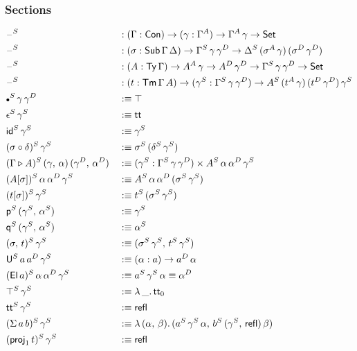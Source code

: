 \documentclass[12pt,a4paper,twoside,openany]{book}
\theoremstyle{remark}
\theoremstyle{definition}
\theoremstyle{theorem}
\newcommand{\refl}{\mathsf{refl}}
\newcommand{\id}{\mathsf{id}}
\newcommand{\Con}{\mathsf{Con}}
\newcommand{\Sub}{\mathsf{Sub}}
\newcommand{\Tm}{\mathsf{Tm}}
\newcommand{\Ty}{\mathsf{Ty}}
\newcommand{\U}{\mathsf{U}}
\newcommand{\El}{\mathsf{El}}
\newcommand{\proj}{\mathsf{proj}}
\renewcommand{\tt}{\mathsf{tt}}
\newcommand{\blank}{\mathord{\hspace{1pt}\text{--}\hspace{1pt}}}
\newcommand{\Set}{\mathsf{Set}}
\newcommand{\ext}{\triangleright}
\newcommand{\emptycon}{\scaleobj{.75}\bullet}
\newcommand{\p}{\mathsf{p}}
\newcommand{\q}{\mathsf{q}}
\newcommand{\defn}{:\equiv}
\begin{document}
\subsubsection{Sections}
\vspace{-0.5em}
\begin{alignat*}{3}
  &\blank^S &&: (\Gamma : \Con) \to (\gamma : \Gamma^A) \to \Gamma^A\,\gamma \to \Set\\
  &\blank^S &&: (\sigma : \Sub\,\Gamma\,\Delta) \to \Gamma^S\,\gamma\,\gamma^D \to \Delta^S\,(\sigma^A\,\gamma)\,(\sigma^D\,\gamma^D)\\
  &\blank^S &&: (A : \Ty\,\Gamma) \to A^A\,\gamma \to A^D\,\gamma^D \to \Gamma^S\,\gamma\,\gamma^D \to \Set\\
  &\blank^S &&: (t : \Tm\,\Gamma\,A) \to (\gamma^S : \Gamma^S\,\gamma\,\gamma^D) \to A^S\,(t^A\,\gamma)\,(t^D\,\gamma^D)\,\gamma^S\\
  &\emptycon^S\,\gamma\,\gamma^D &&\defn \top \\
  &\epsilon^S\,\gamma^S &&\defn \tt\\
  &\id^S\,\gamma^S &&\defn \gamma^S\\
  &(\sigma \circ \delta)^S\,\gamma^S &&\defn \sigma^S\,(\delta^S\,\gamma^S)\\
  &(\Gamma \ext A)^S\,(\gamma,\,\alpha)\,(\gamma^D,\,\alpha^D) &&\defn
    (\gamma^S : \Gamma^S\,\gamma\,\gamma^D) \times A^S\,\alpha\,\alpha^D\,\gamma^S\\
  &(A[\sigma])^S\,\alpha\,\alpha^D\,\gamma^S &&\defn A^S\,\alpha\,\alpha^D\,(\sigma^S\,\gamma^S)\\
  &(t[\sigma])^S\,\gamma^S &&\defn t^S\,(\sigma^S\,\gamma^S)\\
  &\p^S\,(\gamma^S,\,\alpha^S) &&\defn \gamma^S\\
  &\q^S\,(\gamma^S,\,\alpha^S) &&\defn \alpha^S\\
  &(\sigma,\,t)^S\,\gamma^S &&\defn (\sigma^S\,\gamma^S,\,t^S\,\gamma^S)\\
  &\U^S\,a\,a^D\,\gamma^S &&\defn (\alpha : a) \to a^D\,\alpha\\
  &(\El\,a)^S\,\alpha\,\alpha^D\,\gamma^S &&\defn a^S\,\gamma^S\,\alpha \equiv \alpha^D \\
  &\top^S\,\gamma^S &&\defn \lambda\,\_.\,\tt_0\\
  &\tt^S\,\gamma^S &&\defn \refl\\
  &(\Sigma\,a\,b)^S\,\gamma^S &&\defn \lambda\,(\alpha,\,\beta).\,(a^S\,\gamma^S\,\alpha,\,b^S\,(\gamma^S,\,\refl)\,\beta)\\
  &(\proj_1\,t)^S\,\gamma^S &&\defn \refl\\

\end{alignat*}
\end{document}
